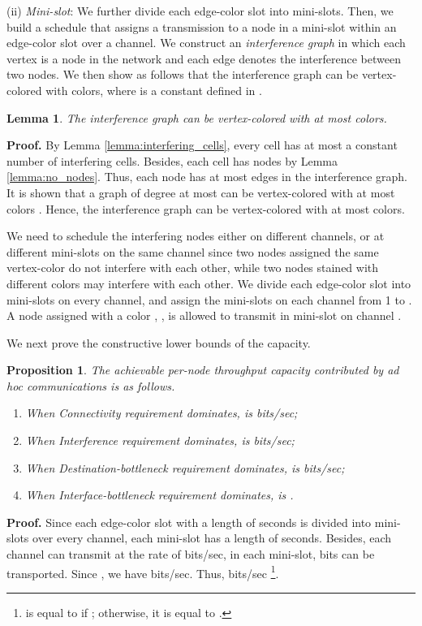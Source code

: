 \documentclass[10pt,journal]{IEEEtran}
\newtheorem{lemma}{Lemma}
\newtheorem{proposition}{Proposition}
\def\done{\hspace*{\fill} }
\begin{document}
(ii) \emph{Mini-slot}: We further divide each edge-color slot into mini-slots. Then, we build a schedule that assigns a transmission to a node in a mini-slot within an edge-color slot over a channel. We construct an \textit{interference graph} in which each vertex is a node in the network and each edge denotes the interference between two nodes. We then show as follows that the interference graph can be vertex-colored with  colors, where  is a constant defined in \cite{Kyasanur:mobicom2005}.
\begin{lemma}
The interference graph can be vertex-colored with at most  colors.
\end{lemma}
\textbf{Proof.}
By Lemma \ref{lemma:interfering_cells}, every cell has at most a constant number of interfering cells. Besides, each cell has  nodes by Lemma \ref{lemma:no_nodes}. Thus, each node has at most  edges in the interference graph. It is shown that a graph of degree at most  can be vertex-colored with at most  colors \cite{Kyasanur:mobicom2005} \cite{Douglas:2001}. Hence, the interference graph can be vertex-colored with at most  colors. \done

We need to schedule the interfering nodes either on different channels, or at different mini-slots on the same channel since two nodes assigned the same vertex-color do not interfere with each other, while two nodes stained with different colors may interfere with each other. We divide each edge-color slot into  mini-slots on every channel, and assign the mini-slots on each channel from 1 to . A node assigned with a color , , is allowed to transmit in mini-slot  on channel .

We next prove the constructive lower bounds of the capacity. 
\begin{proposition}
\label{prop:lower-adhoc}
The achievable per-node throughput capacity  contributed by ad hoc communications is as follows.
\begin{enumerate}
\item[1)] When Connectivity requirement dominates,  is  bits/sec;
\item[2)] When Interference requirement dominates,  is  bits/sec;
\item[3)] When Destination-bottleneck requirement dominates,  is  bits/sec;
\item[4)] When Interface-bottleneck requirement dominates,  is .
\end{enumerate}
\end{proposition}
\textbf{Proof.}
Since each edge-color slot with a length of  seconds is divided into  mini-slots over every channel, each mini-slot has a length of  seconds. Besides, each channel can transmit at the rate of  bits/sec, in each mini-slot,  bits can be transported. Since , we have  bits/sec. Thus,  bits/sec \footnote{ is equal to  if ; otherwise, it is equal to .}. 
\end{document}
